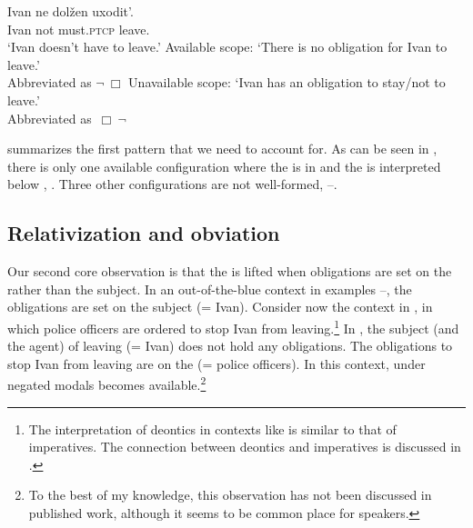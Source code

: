 \documentclass[output=paper,newtxmath,colorlinks,citecolor=brown]{langsci/langscibook}
\begin{document}
\ea \label{arigen} \ea  \gll Ivan ne dolžen uxodit'.\\
    Ivan  not must.\textsc{ptcp} {leave.\im} \\
	\glt `Ivan doesn't have to leave.' \label{ari}
	\ex Available scope: `There is no obligation for Ivan to leave.'\\
    Abbreviated as  $\neg\ \Box$ \im \label{arinegm}
    \ex Unavailable scope: `Ivan has an obligation to stay/not to leave.'\\
     Abbreviated as  $\,\Box\ \neg$ \im \label{arimneg}
  	\z \z

\noindent {} summarizes the first pattern that we need to account for. As can be seen in , there is only one available configuration where the  is in \im and the  is interpreted below , . Three other configurations are not well-formed, --.

	\label{p11}
	\ea[\ding{51}]{$\neg \ \Box$ \im \label{p11a}}
    \ex[\ding{55}]{$\,\Box\ \neg$ \im \label{p11b}}
    \ex[\ding{55}]{$\,\neg \ \Box$ \p \label{p11c}}
    \ex[\ding{55}]{$\,\Box\ \neg$ \p \label{p11d}}
    \z\z


 \subsection{Relativization and obviation}
 Our second core observation is that the  is lifted when obligations are set on the  rather than the subject. In an out-of-the-blue context in examples --, the obligations are set on the subject (= Ivan). Consider now the context in , in which police officers are ordered to stop Ivan from leaving.\footnote{The interpretation of deontics in contexts like  is similar to that of imperatives. The connection between deontics and imperatives is discussed in .
 }
 In , the subject (and the agent) of leaving (= Ivan) does not hold any obligations. The obligations to stop Ivan from leaving are on the  (= police officers). In this context, \p under negated  modals becomes available.\footnote{To the best of my knowledge, this observation has not been discussed in published work, although it seems to be common place for  speakers.
 }
\end{document}
